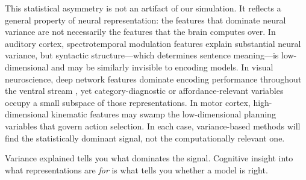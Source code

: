 \documentclass{ccn}
\begin{document}
This statistical asymmetry is not an artifact of our simulation. It
reflects a general property of neural representation: the features that
dominate neural variance are not necessarily the features that the brain
computes over. In auditory cortex, spectrotemporal modulation features
explain substantial neural variance, but syntactic structure---which
determines sentence meaning---is low-dimensional and may be similarly
invisible to encoding models. In visual neuroscience, deep network
features dominate encoding performance throughout the ventral stream
\citep{yamins2014performance}, yet category-diagnostic or
affordance-relevant variables occupy a small subspace of those
representations. In motor cortex, high-dimensional kinematic features may
swamp the low-dimensional planning variables that govern action selection.
In each case, variance-based methods will find the statistically dominant
signal, not the computationally relevant one.

Variance explained tells you what dominates the signal. Cognitive insight
into what representations are \emph{for} is what tells you whether a
model is right.

\printbibliography
\end{document}
